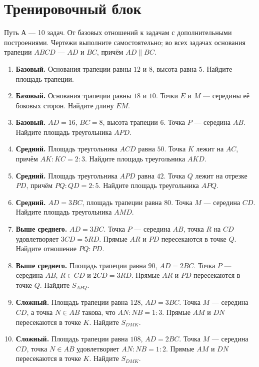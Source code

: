\documentclass[a4paper,12pt]{article}
\begin{document}
\section*{Тренировочный блок}
\textcolor{muted}{Путь А --- 10 задач. От базовых отношений к задачам с дополнительными построениями. Чертежи выполните самостоятельно; во всех задачах основания трапеции $ABCD$ --- $AD$ и $BC$, причём $AD\parallel BC$.}
\begin{enumerate}
\item \textbf{Базовый.} Основания трапеции равны $12$ и $8$, высота равна $5$. Найдите площадь трапеции.
\item \textbf{Базовый.} Основания трапеции равны $18$ и $10$. Точки $E$ и $M$ --- середины её боковых сторон. Найдите длину $EM$.
\item \textbf{Базовый.} $AD=16$, $BC=8$, высота трапеции $6$. Точка $P$ --- середина $AB$. Найдите площадь треугольника $APD$.
\item \textbf{Средний.} Площадь треугольника $ACD$ равна $50$. Точка $K$ лежит на $AC$, причём $AK:KC=2:3$. Найдите площадь треугольника $AKD$.
\item \textbf{Средний.} Площадь треугольника $APD$ равна $42$. Точка $Q$ лежит на отрезке $PD$, причём $PQ:QD=2:5$. Найдите площадь треугольника $APQ$.
\item \textbf{Средний.} $AD=3BC$, площадь трапеции равна $80$. Точка $M$ --- середина $CD$. Найдите площадь треугольника $AMD$.
\item \textbf{Выше среднего.} $AD=3BC$. Точка $P$ --- середина $AB$, точка $R$ на $CD$ удовлетворяет $3CD=5RD$. Прямые $AR$ и $PD$ пересекаются в точке $Q$. Найдите отношение $PQ:PD$.
\item \textbf{Выше среднего.} Площадь трапеции равна $90$, $AD=2BC$. Точка $P$ --- середина $AB$, $R\in CD$ и $2CD=3RD$. Прямые $AR$ и $PD$ пересекаются в точке $Q$. Найдите $S_{APQ}$.
\item \textbf{Сложный.} Площадь трапеции равна $128$, $AD=3BC$. Точка $M$ --- середина $CD$, а точка $N\in AB$ такова, что $AN:NB=1:3$. Прямые $AM$ и $DN$ пересекаются в точке $K$. Найдите $S_{DMK}$.
\item \textbf{Сложный.} Площадь трапеции равна $108$, $AD=2BC$. Точка $M$ --- середина $CD$, точка $N\in AB$ удовлетворяет $AN:NB=1:2$. Прямые $AM$ и $DN$ пересекаются в точке $K$. Найдите $S_{DMK}$.
\end{enumerate}
\clearpage
\end{document}
